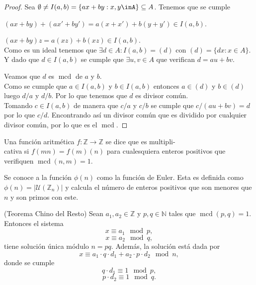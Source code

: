 \begin{proof}
	Sea $\emptyset \neq I(a,b)=\{ax+by:x,y\inA\}\subseteq A$. Tenemos que se cumple\par
	 $(ax+by)+(ax'+by')=a(x+x')+b(y+y')\in I(a,b)$.\par
	 $(ax+by)z=a(xz)+b(xz)\in I(a,b)$.\\
	 Como es un ideal tenemos que $\exists d \in A:I(a,b)=(d)$ con $(d)=\{dx:x\in A\}$. Y dado que $d\in I(a,b)$ se cumple que $\exists u,v \in A$ que verifican $d=au+bv$.\par
	 Veamos que $d$ es $\operatorname{mcd}$ de $a$ y $b$.\\ Como se cumple que $a\in I(a,b)$ y $b\in I(a,b)$ entonces $a\in (d)$ y $b\in (d)$ luego $d/a$ y $d/b$. Por lo que tenemos que $d$ es divisor común.\\
	 Tomando $c\in I(a,b)$ de manera que $c/a$ y $c/b$ se cumple que $c/(au+bv)=d$ por lo que $c/d$. Encontrando así un divisor común que es dividido por cualquier divisor común, por lo que es el $\operatorname{mcd}$.
\end{proof}
\begin{definicion}
		Una función aritmética $f:\mathbb{Z}\rightarrow \mathbb{Z}$ se dice que es multipli-\\cativa si $f(mn)=f(m)(n)$ para cualesquiera enteros positivos que verifiquen $\operatorname{mcd}(n,m)=1$.
\end{definicion}
\begin{definicion}
		Se conoce a la función $\phi(n)$ como la función de Euler. Esta es definida como $\phi(n)=|\mathcal{U}(\mathbb{Z}_n)|$ y calcula el número de enteros positivos que son menores que $n$ y son primos con este. 
\end{definicion}
\begin{teorema}
		(Teorema Chino del Resto) Sean $a_1, a_2\in \mathbb{Z}$ y $p,q \in \mathbb{N}$ tales que $\operatorname{mcd}(p,q) = 1$. Entonces el sistema
		$$
			x\equiv a_1 \mod p,
		$$\vspace*{-8mm}
		$$
			x\equiv a_2 \mod q,
		$$
	tiene solución única módulo $n=pq$. Además, la solución está dada por
	$$
		x\equiv a_1\cdot q\cdot d_1 +a_2\cdot p\cdot d_2 \mod n,
	$$
	donde se cumple
	$$
		q\cdot d_1 \equiv 1 \mod p,
	$$\vspace*{-7mm}
	$$
		p\cdot d_2 \equiv 1 \mod q.
	$$
\end{teorema}
